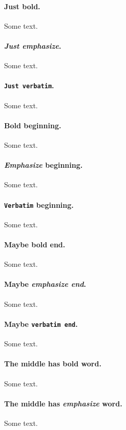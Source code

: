 \documentclass[%
oneside,                 %
final,                   %
10pt]{article}
\theoremstyle{definition}
\begin{document}
\begin{enumerate}
\paragraph{\textbf{Just bold}.}
Some text.

\paragraph{\emph{Just emphasize}.}
Some text.

\paragraph{\texttt{Just verbatim}.}
Some text.

\paragraph{\textbf{Bold} beginning.}
Some text.

\paragraph{\emph{Emphasize} beginning.}
Some text.

\paragraph{\texttt{Verbatim} beginning.}
Some text.

\paragraph{Maybe \textbf{bold end}.}
Some text.

\paragraph{Maybe \emph{emphasize end}.}
Some text.

\paragraph{Maybe \texttt{verbatim end}.}
Some text.

\paragraph{The middle has \textbf{bold} word.}
Some text.

\paragraph{The middle has \emph{emphasize} word.}
Some text.


\end{enumerate}
\end{document}
